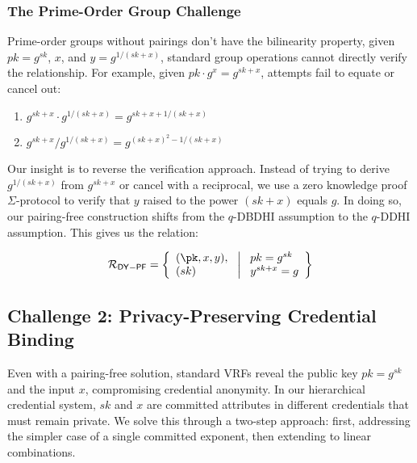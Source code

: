 \subsubsection{The Prime-Order Group Challenge}

Prime-order groups without pairings don't have the bilinearity property, given $pk = g^{sk}$, $x$, and $y = g^{1/(sk+x)}$, standard group operations cannot directly verify the relationship. For example, given $pk  \cdot g^x = g^{sk+x}$, attempts fail to equate or cancel out:

\begin{enumerate}
    \item $g^{sk+x} \cdot g^{1/(sk+x)} = g^{sk+x+1/(sk+x)}$
    \item $g^{sk+x}/g^{1/(sk+x)} = g^{(sk+x)^2-1/(sk+x)}$
\end{enumerate}

Our insight is to reverse the verification approach. Instead of trying to derive $g^{1/(sk+x)}$ from $g^{sk+x}$ or cancel with a reciprocal, we use a zero knowledge proof $\Sigma$-protocol to verify that $y$ raised to the power $(sk+x)$ equals $g$. In doing so, our pairing-free construction shifts from the $q$-DBDHI assumption to the $q$-DDHI assumption. This gives us the relation:

\[
\mathcal{R}_{\mathsf{DY-PF}} = \left\{ 
\begin{array}{l} 
(\pk, x, y),\\
(sk) 
\end{array}
\ \middle|
\ \begin{array}{l}
pk = g^{sk} \\
y^{sk + x} = g  \\
\end{array} \right\}
\]

\subsection{Challenge 2: Privacy-Preserving Credential Binding}

Even with a pairing-free solution, standard VRFs reveal the public key $pk = g^{sk}$ and the input $x$,  compromising credential anonymity. In our hierarchical credential system, $sk$ and $x$ are committed attributes in different credentials that must remain private. We solve this through a two-step approach: first, addressing the simpler case of a single committed exponent, then extending to linear combinations.


